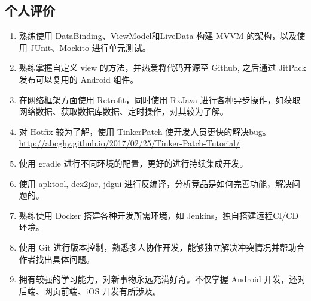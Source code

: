 \documentclass[11pt]{res}
\begin{document}
\begin{resume}
\section{个人评价}
  \begin{enumerate}
      \item 熟练使用 DataBinding、ViewModel和LiveData 构建 MVVM 的架构，以及使用 JUnit、Mockito 进行单元测试。
      \item 熟练掌握自定义 view 的方法，并热爱将代码开源至 Github, 之后通过 JitPack 发布可以复用的 Android 组件。
      \item 在网络框架方面使用 Retrofit，同时使用 RxJava 进行各种异步操作，如获取网络数据、获取数据库数据、定时操作，对其较为了解。
      \item 对 Hotfix 较为了解，使用 TinkerPatch 使开发人员更快的解决bug。\\ \url{http://abcghy.github.io/2017/02/25/Tinker-Patch-Tutorial/}
      \item 使用 gradle 进行不同环境的配置，更好的进行持续集成开发。
      \item 使用 apktool, dex2jar, jdgui 进行反编译，分析竞品是如何完善功能，解决问题的。
      \item 熟练使用 Docker 搭建各种开发所需环境，如 Jenkins，独自搭建远程CI/CD环境。
      \item 使用 Git 进行版本控制，熟悉多人协作开发，能够独立解决冲突情况并帮助合作者找出具体问题。
      \item 拥有较强的学习能力，对新事物永远充满好奇。不仅掌握 Android 开发，还对后端、网页前端、iOS 开发有所涉及。
  \end{enumerate}

\end{resume}
\end{document}
